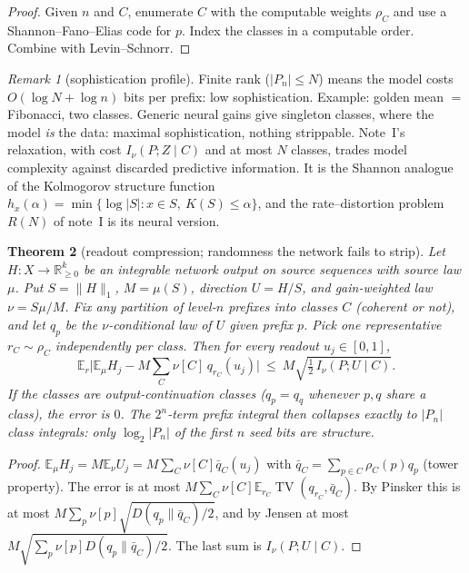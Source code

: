 \documentclass[11pt]{article}
\newtheorem{theorem}{Theorem}[section]
\theoremstyle{definition}
\theoremstyle{remark}
\newtheorem{remark}[theorem]{Remark}
\newcommand{\R}{\mathbb R}
\newcommand{\E}{\mathbb E}
\newcommand{\TV}{\operatorname{TV}}
\begin{document}
\begin{proof}
Given $n$ and $C$, enumerate $C$ with the computable weights $\rho_C$ and use a Shannon--Fano--Elias code for $p$. Index the classes in a computable order. Combine with Levin--Schnorr.
\end{proof}

\begin{remark}[sophistication profile]
Finite rank ($|P_n|\le N$) means the model costs $O(\log N+\log n)$ bits per prefix: low sophistication. Example: golden mean $=$ Fibonacci, two classes. Generic neural gains give singleton classes, where the model \emph{is} the data: maximal sophistication, nothing strippable. Note~I's relaxation, with cost $I_\nu(P;Z\mid C)$ and at most $N$ classes, trades model complexity against discarded predictive information. It is the Shannon analogue of the Kolmogorov structure function $h_x(\alpha)=\min\{\log|S|:x\in S,\ K(S)\le\alpha\}$, and the rate--distortion problem $R(N)$ of note~I is its neural version.
\end{remark}

\begin{theorem}[readout compression; randomness the network fails to strip]\label{thm:compress}
Let $H:X\to\R^k_{\ge0}$ be an integrable network output on source sequences with source law $\mu$. Put $S=\|H\|_1$, $M=\mu(S)$, direction $U=H/S$, and gain-weighted law $\nu=S\mu/M$. Fix any partition of level-$n$ prefixes into classes $C$ (coherent or not), and let $q_p$ be the $\nu$-conditional law of $U$ given prefix $p$. Pick one representative $r_C\sim\rho_C$ independently per class. Then for every readout $u_j\in[0,1]$,
\[\E_{r}\Big|\E_\mu H_j-M\sum_C\nu[C]\,q_{r_C}(u_j)\Big|\ \le\ M\sqrt{\tfrac12\,I_\nu(P;U\mid C)}.\]
If the classes are \emph{output-continuation classes} ($q_p=q_q$ whenever $p,q$ share a class), the error is $0$. The $2^n$-term prefix integral then collapses exactly to $|P_n|$ class integrals: only $\log_2|P_n|$ of the first $n$ seed bits are structure.
\end{theorem}

\begin{proof}
$\E_\mu H_j=M\E_\nu U_j=M\sum_C\nu[C]\bar q_C(u_j)$ with $\bar q_C=\sum_{p\in C}\rho_C(p)q_p$ (tower property). The error is at most $M\sum_C\nu[C]\E_{r_C}\TV(q_{r_C},\bar q_C)$. By Pinsker this is at most $M\sum_p\nu[p]\sqrt{D(q_p\|\bar q_C)/2}$, and by Jensen at most $M\sqrt{\sum_p\nu[p]D(q_p\|\bar q_C)/2}$. The last sum is $I_\nu(P;U\mid C)$.
\end{proof}
\end{document}
